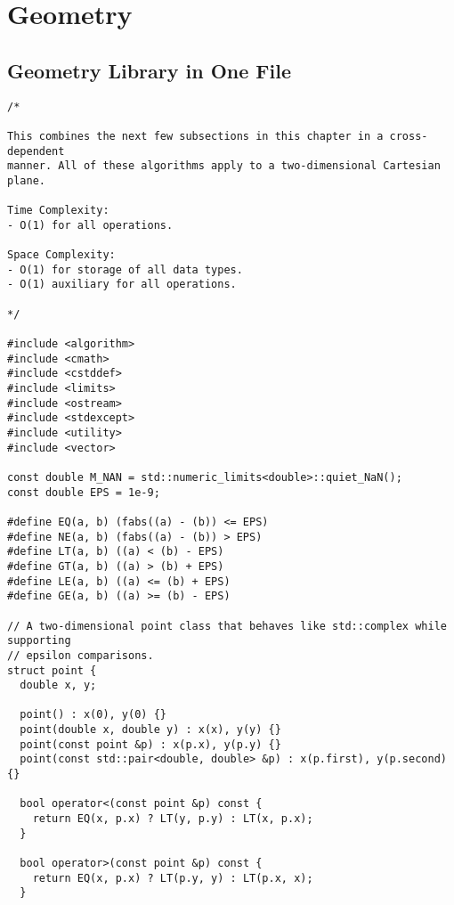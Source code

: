 \chapter{Geometry}

\section{Geometry Library in One File}
\setcounter{section}{0}
\begin{lstlisting}
/*

This combines the next few subsections in this chapter in a cross-dependent
manner. All of these algorithms apply to a two-dimensional Cartesian plane.

Time Complexity:
- O(1) for all operations.

Space Complexity:
- O(1) for storage of all data types.
- O(1) auxiliary for all operations.

*/

#include <algorithm>
#include <cmath>
#include <cstddef>
#include <limits>
#include <ostream>
#include <stdexcept>
#include <utility>
#include <vector>

const double M_NAN = std::numeric_limits<double>::quiet_NaN();
const double EPS = 1e-9;

#define EQ(a, b) (fabs((a) - (b)) <= EPS)
#define NE(a, b) (fabs((a) - (b)) > EPS)
#define LT(a, b) ((a) < (b) - EPS)
#define GT(a, b) ((a) > (b) + EPS)
#define LE(a, b) ((a) <= (b) + EPS)
#define GE(a, b) ((a) >= (b) - EPS)

// A two-dimensional point class that behaves like std::complex while supporting
// epsilon comparisons.
struct point {
  double x, y;

  point() : x(0), y(0) {}
  point(double x, double y) : x(x), y(y) {}
  point(const point &p) : x(p.x), y(p.y) {}
  point(const std::pair<double, double> &p) : x(p.first), y(p.second) {}

  bool operator<(const point &p) const {
    return EQ(x, p.x) ? LT(y, p.y) : LT(x, p.x);
  }

  bool operator>(const point &p) const {
    return EQ(x, p.x) ? LT(p.y, y) : LT(p.x, x);
  }


\end{lstlisting}
